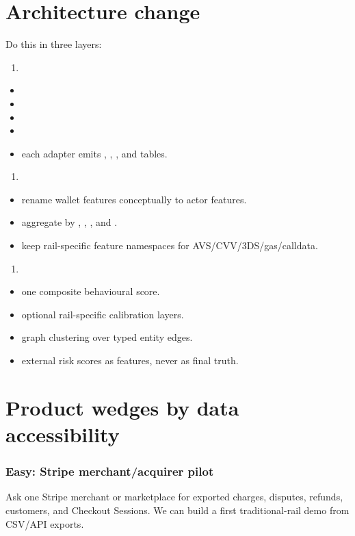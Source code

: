\documentclass[11pt]{article}
\begin{document}
\section{Architecture change}
Do this in three layers:

\begin{enumerate}
  \item {}
\end{enumerate}
\begin{itemize}
  \item {}
  \item {}
  \item {}
  \item {}
  \item each adapter emits , , , and  tables.
\end{itemize}
\begin{enumerate}
  \item {}
\end{enumerate}
\begin{itemize}
  \item rename wallet features conceptually to actor features.
  \item aggregate by , , , and .
  \item keep rail-specific feature namespaces for AVS/CVV/3DS/gas/calldata.
\end{itemize}
\begin{enumerate}
  \item {}
\end{enumerate}
\begin{itemize}
  \item one composite behavioural score.
  \item optional rail-specific calibration layers.
  \item graph clustering over typed entity edges.
  \item external risk scores as features, never as final truth.
\end{itemize}
\section{Product wedges by data accessibility}
\subsubsection*{Easy: Stripe merchant/acquirer pilot}
Ask one Stripe merchant or marketplace for exported charges, disputes, refunds, customers, and Checkout Sessions. We can build a first traditional-rail demo from CSV/API exports.
\end{document}

